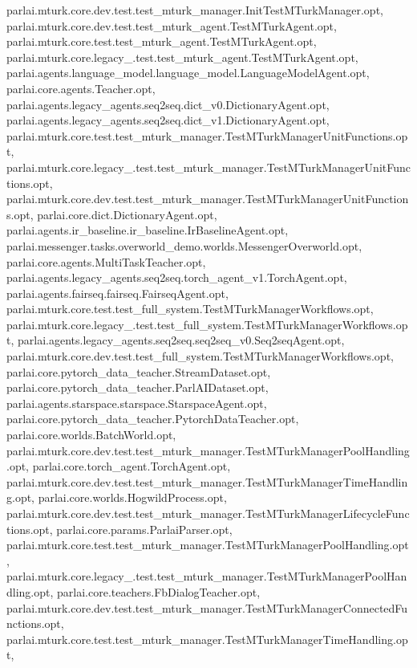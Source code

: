 parlai.\+mturk.\+core.\+dev.\+test.\+test\+\_\+mturk\+\_\+manager.\+Init\+Test\+M\+Turk\+Manager.\+opt, parlai.\+mturk.\+core.\+dev.\+test.\+test\+\_\+mturk\+\_\+agent.\+Test\+M\+Turk\+Agent.\+opt, parlai.\+mturk.\+core.\+test.\+test\+\_\+mturk\+\_\+agent.\+Test\+M\+Turk\+Agent.\+opt, parlai.\+mturk.\+core.\+legacy\+\_.\+test.\+test\+\_\+mturk\+\_\+agent.\+Test\+M\+Turk\+Agent.\+opt, parlai.\+agents.\+language\+\_\+model.\+language\+\_\+model.\+Language\+Model\+Agent.\+opt, parlai.\+core.\+agents.\+Teacher.\+opt, parlai.\+agents.\+legacy\+\_\+agents.\+seq2seq.\+dict\+\_\+v0.\+Dictionary\+Agent.\+opt, parlai.\+agents.\+legacy\+\_\+agents.\+seq2seq.\+dict\+\_\+v1.\+Dictionary\+Agent.\+opt, parlai.\+mturk.\+core.\+test.\+test\+\_\+mturk\+\_\+manager.\+Test\+M\+Turk\+Manager\+Unit\+Functions.\+opt, parlai.\+mturk.\+core.\+legacy\+\_.\+test.\+test\+\_\+mturk\+\_\+manager.\+Test\+M\+Turk\+Manager\+Unit\+Functions.\+opt, parlai.\+mturk.\+core.\+dev.\+test.\+test\+\_\+mturk\+\_\+manager.\+Test\+M\+Turk\+Manager\+Unit\+Functions.\+opt, parlai.\+core.\+dict.\+Dictionary\+Agent.\+opt, parlai.\+agents.\+ir\+\_\+baseline.\+ir\+\_\+baseline.\+Ir\+Baseline\+Agent.\+opt, parlai.\+messenger.\+tasks.\+overworld\+\_\+demo.\+worlds.\+Messenger\+Overworld.\+opt, parlai.\+core.\+agents.\+Multi\+Task\+Teacher.\+opt, parlai.\+agents.\+legacy\+\_\+agents.\+seq2seq.\+torch\+\_\+agent\+\_\+v1.\+Torch\+Agent.\+opt, parlai.\+agents.\+fairseq.\+fairseq.\+Fairseq\+Agent.\+opt, parlai.\+mturk.\+core.\+test.\+test\+\_\+full\+\_\+system.\+Test\+M\+Turk\+Manager\+Workflows.\+opt, parlai.\+mturk.\+core.\+legacy\+\_.\+test.\+test\+\_\+full\+\_\+system.\+Test\+M\+Turk\+Manager\+Workflows.\+opt, parlai.\+agents.\+legacy\+\_\+agents.\+seq2seq.\+seq2seq\+\_\+v0.\+Seq2seq\+Agent.\+opt, parlai.\+mturk.\+core.\+dev.\+test.\+test\+\_\+full\+\_\+system.\+Test\+M\+Turk\+Manager\+Workflows.\+opt, parlai.\+core.\+pytorch\+\_\+data\+\_\+teacher.\+Stream\+Dataset.\+opt, parlai.\+core.\+pytorch\+\_\+data\+\_\+teacher.\+Parl\+A\+I\+Dataset.\+opt, parlai.\+agents.\+starspace.\+starspace.\+Starspace\+Agent.\+opt, parlai.\+core.\+pytorch\+\_\+data\+\_\+teacher.\+Pytorch\+Data\+Teacher.\+opt, parlai.\+core.\+worlds.\+Batch\+World.\+opt, parlai.\+mturk.\+core.\+dev.\+test.\+test\+\_\+mturk\+\_\+manager.\+Test\+M\+Turk\+Manager\+Pool\+Handling.\+opt, parlai.\+core.\+torch\+\_\+agent.\+Torch\+Agent.\+opt, parlai.\+mturk.\+core.\+dev.\+test.\+test\+\_\+mturk\+\_\+manager.\+Test\+M\+Turk\+Manager\+Time\+Handling.\+opt, parlai.\+core.\+worlds.\+Hogwild\+Process.\+opt, parlai.\+mturk.\+core.\+dev.\+test.\+test\+\_\+mturk\+\_\+manager.\+Test\+M\+Turk\+Manager\+Lifecycle\+Functions.\+opt, parlai.\+core.\+params.\+Parlai\+Parser.\+opt, parlai.\+mturk.\+core.\+test.\+test\+\_\+mturk\+\_\+manager.\+Test\+M\+Turk\+Manager\+Pool\+Handling.\+opt, parlai.\+mturk.\+core.\+legacy\+\_.\+test.\+test\+\_\+mturk\+\_\+manager.\+Test\+M\+Turk\+Manager\+Pool\+Handling.\+opt, parlai.\+core.\+teachers.\+Fb\+Dialog\+Teacher.\+opt, parlai.\+mturk.\+core.\+dev.\+test.\+test\+\_\+mturk\+\_\+manager.\+Test\+M\+Turk\+Manager\+Connected\+Functions.\+opt, parlai.\+mturk.\+core.\+test.\+test\+\_\+mturk\+\_\+manager.\+Test\+M\+Turk\+Manager\+Time\+Handling.\+opt, 